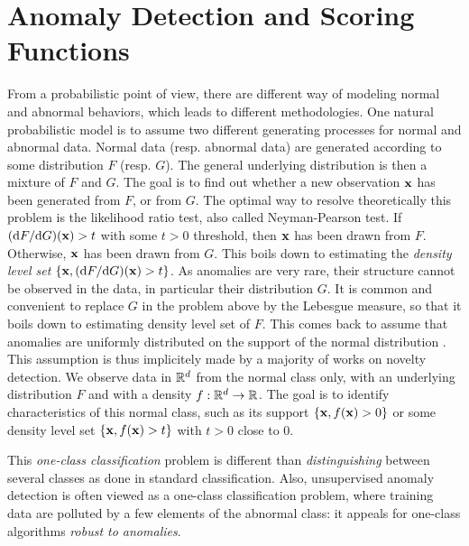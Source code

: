 \section{Anomaly Detection and Scoring Functions}
\label{resume:scoring_function}
From a probabilistic point of view, there are different way of modeling normal and abnormal behaviors, which leads to different methodologies. One natural probabilistic model is to assume two different generating processes for normal and abnormal data. Normal data (resp. abnormal data) are generated according to some distribution $F$ (resp. $G$). The general underlying distribution is then a mixture of $F$ and $G$. The goal is to find out whether a new observation $\mathbf x$ has been generated from $F$, or from $G$. The optimal way to resolve theoretically this problem is the likelihood ratio test, also called Neyman-Pearson test. If $(\mathrm{d}  F / \mathrm{d}  G) ( \mathbf x) > t$ with some $t>0$ threshold, then $\mathbf x$ has been drawn from $F$. Otherwise, $\mathbf x$ has been drawn from $G$. This boils down to estimating the \emph{density level set} $\{\mathbf x, (\mathrm{d} F / \mathrm{d}  G) (\mathbf x) > t\}$.
%
As anomalies are very rare, their structure cannot be observed in the data, in particular their distribution $G$. 
%
It is common and convenient to replace $G$ in the problem above by the Lebesgue measure, so that it boils down to estimating density level set of $F$.
This comes back to assume that anomalies are uniformly distributed on the support of the normal distribution \citep{Blanchard2010}. This assumption is thus implicitely made by a majority of works on novelty detection.
We observe data in $\mathbb{R}^d$ from the normal class only, with an underlying distribution $F$ and with a density $f: \mathbb{R}^d \to \mathbb{R}$. 
The goal is to identify characteristics of this normal class, such as its support $\{\mathbf x, f( \mathbf x) > 0\}$ or some density level set $\{\mathbf x, f( \mathbf x) > t\}$ with $t>0$ close to $0$.

This \emph{one-class classification} problem is different than \emph{distinguishing} between several classes as done in standard classification. Also, unsupervised anomaly detection is often viewed as a one-class classification problem, where training data are polluted by a few elements of the abnormal class: it appeals for one-class algorithms \emph{robust to anomalies}. 

